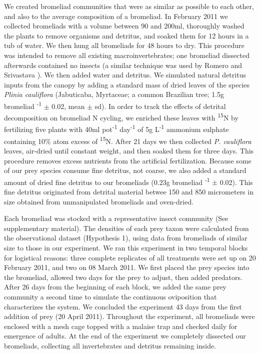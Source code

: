 \documentclass[11pt]{article}
\begin{document}
We created bromeliad communities that were as similar as possible to
each other, and also to the average composition of a bromeliad. In
February 2011 we collected bromeliads with a volume between 90 and
200ml, thoroughly washed the plants to remove organisms and detritus,
and soaked them for 12 hours in a tub of water. We then hung all
bromeliads for 48 hours to dry. This procedure was intended to remove
all existing macroinvertebrates; one bromeliad dissected afterwards
contained no insects (a similar technique was used by Romero and
Srivastava \citeyearpar{Romero2010}). We then added water and detritus. We simulated natural detritus
inputs from the canopy by adding a standard mass of dried leaves of the
species \emph{Plinia cauliflora} (Jabuticaba, Myrtaceae; a common
Brazilian tree; 1.5g bromeliad \textsuperscript{-1} $\pm$ 0.02, mean $\pm$ sd).
In order to track the effects of detrital decomposition on bromeliad N
cycling, we enriched these leaves with \textsuperscript{15}N by
fertilizing five plants with 40ml pot\textsuperscript{-1}
day\textsuperscript{-1} of 5g L\textsuperscript{-1} ammonium sulphate
containing 10\% atom excess of \textsuperscript{15}N. After 21 days we
then collected \emph{P. cauliflora} leaves, air-dried until constant
weight, and then soaked them for three days. This procedure removes
excess nutrients from the artificial fertilization. Because some of our
prey species consume fine detritus, not coarse, we also added a standard
amount of dried fine detritus to our bromeliads (0.23g bromeliad
\textsuperscript{-1} $\pm$ 0.02). This fine detritus originated from detrital material betwee 150 and 850 micrometers in size obtained from unmanipulated bromeliads and oven-dried. 

Each bromeliad was stocked with a representative insect community (See
supplementary material). The densities of each prey taxon were
calculated from the observational dataset (Hypothesis 1), using data
from bromeliads of similar size to those in our experiment. We ran this
experiment in two temporal blocks for logistical reasons: three complete
replicates of all treatments were set up on 20 February 2011, and two on
08 March 2011. We first placed the prey species into the bromeliad,
allowed two days for the prey to adjust, then added predators. After 26
days from the beginning of each block, we added the same prey community
a second time to simulate the continuous oviposition that characterizes
the system. We concluded the experiment 43 days from the first addition
of prey (20 April 2011). Throughout the experiment, all bromeliads were
enclosed with a mesh cage topped with a malaise trap and checked daily
for emergence of adults. At the end of the experiment we completely
dissected our bromeliads, collecting all invertebrates and detritus
remaining inside.
\end{document}
